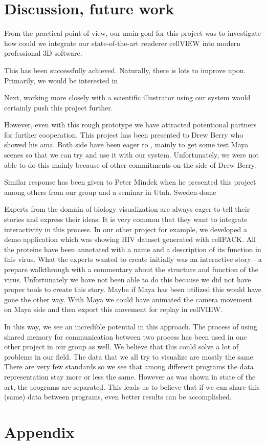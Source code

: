 \documentclass[
  digital, %
  table,   %
  nolof,     %
  nolot,     %
]{fithesis3}
\begin{document}

\chapter{Discussion, future work}
\label{chap:discussion}
From the practical point of view, our main goal for this project was to investigate how could we integrate our state-of-the-art renderer cellVIEW into modern professional 3D software.

This has been successfully achieved. Naturally, there is lots to improve upon. Primarily, we would be interested in

Next, working more closely with a scientific illustrator using our system would certainly push this project further.

However, even with this rough prototype we have attracted potentional partners for further cooperation. This project has been presented to Drew Berry who showed his ama. Both side have been eager to , mainly to get some test Maya scenes so that we can try and use it with our system. Unfortunately, we were not able to do this mainly because of other commitments on the side of Drew Berry.

Similar response has been given to Peter Mindek when he presented this project among others from our group and a seminar in Utah. Sweden-dome

Experts from the domain of biology visualization are always eager to tell their stories and express their ideas. It is very common that they want to integrate interactivity in this process. In our other project for example, we developed a demo application which was showing HIV dataset generated with cellPACK. All the proteins have been annotated with a name and a description of its function in this virus. What the experts wanted to create initially was an interactive story—a prepare walkthrough with a commentary about the structure and function of the virus. Unfortunately we have not been able to do this because we did not have proper tools to create this story. Maybe if Maya has been utilized this would have gone the other way. With Maya we could have animated the camera movement on Maya side and then export this movement for replay in cellVIEW.

In this way, we see an incredible potential in this approach. The process of using shared memory for communication between two process has been used in one other project in our group as well. We believe that this could solve a lot of problems in our field. The data that we all try to visualize are mostly the same. There are very few standards so we see that among different programs the data representation stay more or less the same. However as was shown in state of the art, the programs are separated. This leads us to believe that if we can share this (same) data between programs, even better results can be accomplished.

\newpage
\printbibliography[heading=bibintoc]

\appendix %
\chapter{Appendix}
\end{document}

